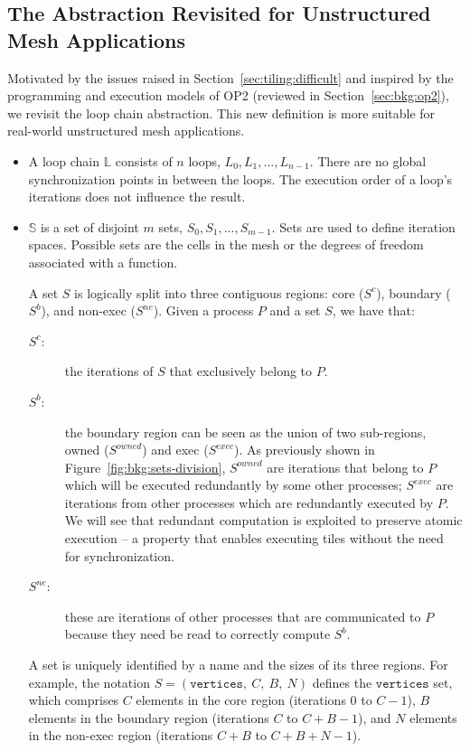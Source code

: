 \subsection{The Abstraction Revisited for Unstructured Mesh Applications}
\label{sec:tiling:lc-unstruct}
Motivated by the issues raised in Section~\ref{sec:tiling:difficult} and inspired by the programming and execution models of OP2 (reviewed in Section~\ref{sec:bkg:op2}), we revisit the loop chain abstraction. This new definition is more suitable for real-world unstructured mesh applications.

\begin{itemize}
\item A loop chain $\mathbb{L}$ consists of $n$ loops, $L_0, L_1, ..., L_{n-1}$. There are no global synchronization points in between the loops. The execution order of a loop's iterations does not influence the result. 

\item $\mathbb{S}$ is a set of disjoint $m$ sets, $S_0, S_1, ..., S_{m-1}$. Sets are used to define iteration spaces. Possible sets are the cells in the mesh or the degrees of freedom associated with a function.  

A set $S$ is logically split into three contiguous regions: core ($S^{c}$), boundary ($S^{b}$), and non-exec ($S^{ne}$). Given a process $P$ and a set $S$, we have that:
\begin{description}
 \item[$S^{c}$:] the iterations of $S$ that exclusively belong to $P$.
 \item[$S^{b}$:] the boundary region can be seen as the union of two sub-regions, owned ($S^{owned}$) and exec ($S^{exec}$). As previously shown in Figure~\ref{fig:bkg:sets-division}, $S^{owned}$ are iterations that belong to $P$ which will be executed redundantly by some other processes; $S^{exec}$ are iterations from other processes which are redundantly executed by $P$. We will see that redundant computation is exploited to preserve atomic execution -- a property that enables executing tiles without the need for synchronization.
  \item[$S^{ne}$:] these are iterations of other processes that are communicated to $P$ because they need be read to correctly compute $S^{b}$.
 \end{description} 
 
A set is uniquely identified by a name and the sizes of its three regions. For example, the notation $S = (\texttt{vertices},\ C,\ B,\ N)$ defines the $\texttt{vertices}$ set, which comprises $C$ elements in the core region (iterations $0$ to $C-1$), $B$ elements in the boundary region (iterations $C$ to $C+B-1$), and $N$ elements in the non-exec region (iterations $C+B$ to $C+B+N-1$).


\end{itemize}
